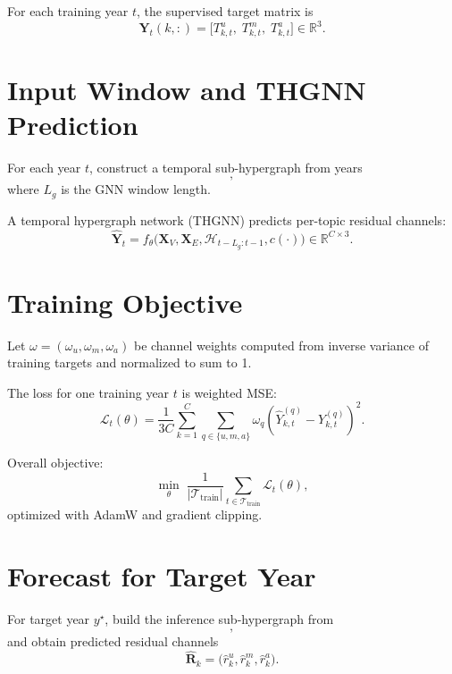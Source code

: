 \documentclass[11pt]{article}
\begin{document}
For each training year $t$, the supervised target matrix is
\begin{equation}
\mathbf{Y}_t(k,:) = \big[T^u_{k,t},\;T^m_{k,t},\;T^a_{k,t}\big] \in \mathbb{R}^{3}.
\end{equation}

\section{Input Window and THGNN Prediction}
For each year $t$, construct a temporal sub-hypergraph from years
\begin{equation}
[t-L_g,\;t-1],
\end{equation}
where $L_g$ is the GNN window length.

A temporal hypergraph network (THGNN) predicts per-topic residual channels:
\begin{equation}
\widehat{\mathbf{Y}}_t = f_\theta\big(\mathbf{X}_V,\mathbf{X}_E,\mathcal{H}_{t-L_g:t-1},c(\cdot)\big)
\in \mathbb{R}^{C\times 3}.
\end{equation}

\section{Training Objective}
Let $\omega=(\omega_u,\omega_m,\omega_a)$ be channel weights computed from inverse variance of training targets and normalized to sum to 1.

The loss for one training year $t$ is weighted MSE:
\begin{equation}
\mathcal{L}_t(\theta)=\frac{1}{3C}\sum_{k=1}^{C}\sum_{q\in\{u,m,a\}}\omega_q\left(\widehat{Y}^{(q)}_{k,t}-Y^{(q)}_{k,t}\right)^2.
\end{equation}

Overall objective:
\begin{equation}
\min_{\theta}\;\frac{1}{|\mathcal{T}_{\text{train}}|}\sum_{t\in\mathcal{T}_{\text{train}}}\mathcal{L}_t(\theta),
\end{equation}
optimized with AdamW and gradient clipping.

\section{Forecast for Target Year}
For target year $y^\star$, build the inference sub-hypergraph from
\begin{equation}
[y^\star-L_g,\;y^\star-1],
\end{equation}
and obtain predicted residual channels
\begin{equation}
\widehat{\mathbf{R}}_{k} = \big(\widehat{r}^u_k,\widehat{r}^m_k,\widehat{r}^a_k\big).
\end{equation}
\end{document}
